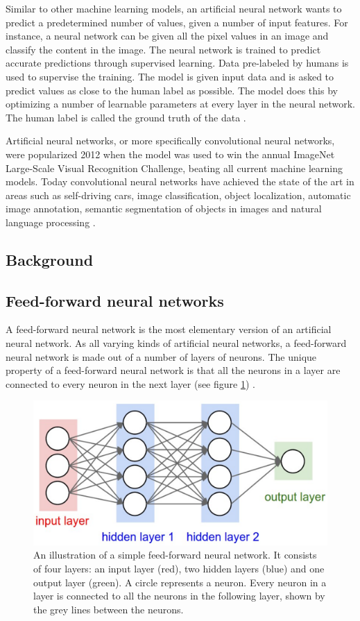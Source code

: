 \documentclass[a4paper, twoside]{article}
\begin{document}
Similar to other machine learning models, an artificial neural network wants to predict a predetermined number of values, given a number of input features. For instance, a neural network can be given all the pixel values in an image and classify the content in the image. The neural network is trained to predict accurate predictions through supervised learning. Data pre-labeled by humans is used to supervise the training. The model is given input data and is asked to predict values as close to the human label as possible. The model does this by optimizing a number of learnable parameters at every layer in the neural network. The human label is called the ground truth of the data \cite{cs231n}.

Artificial neural networks, or more specifically convolutional neural networks, were popularized 2012 when the model was used to win the annual ImageNet Large-Scale Visual Recognition Challenge, beating all current machine learning models. Today convolutional neural networks have achieved the state of the art in areas such as self-driving cars, image classification, object localization, automatic image annotation, semantic segmentation of objects in images and natural language processing \cite{cs231n}.

\subsection{Background}
\subsection{Feed-forward neural networks}
A feed-forward neural network is the most elementary version of an artificial neural network. As all varying kinds of artificial neural networks, a feed-forward neural network is made out of a number of layers of neurons. The unique property of a feed-forward neural network is that all the neurons in a layer are connected to every neuron in the next layer (see figure \ref{figfeedforward}) \cite{cs231n}.

\begin{figure}[h]
	\centering
  		\includegraphics[scale=1]{feedforward.png}
  	\caption{An illustration \cite{hidden12} of a simple feed-forward neural network. It consists of four layers: an input layer (red), two hidden layers (blue) and one output layer (green). A circle represents a neuron. Every neuron in a layer is connected to all the neurons in the following layer, shown by the grey lines between the neurons. } \label{figfeedforward}
\end{figure}
\end{document}
